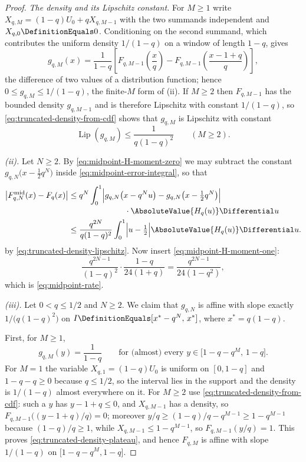 \documentclass[11pt,a4paper,oneside,openany]{book}
\theoremstyle{definition}
\theoremstyle{remark}
\begin{document}
\begin{proof}
\emph{The density and its Lipschitz constant.}  For $M\ge1$ write
$X_{q,M}=(1-q)U_0+qX_{q,M-1}$ with the two summands independent and
$X_{q,0}\DefinitionEquals0$.  Conditioning on the second summand, which contributes the
uniform density $1/(1-q)$ on a window of length $1-q$, gives
\begin{equation}\label{eq:truncated-density-from-cdf}
 g_{q,M}(x)=\frac1{1-q}
 \left[F_{q,M-1}\!\left(\frac xq\right)-F_{q,M-1}\!\left(\frac{x-1+q}q\right)\right],
\end{equation}
the difference of two values of a distribution function; hence
$0\le g_{q,M}\le1/(1-q)$, the finite-$M$ form of
(ii).  If $M\ge2$ then $F_{q,M-1}$ has
the bounded density $g_{q,M-1}$ and is therefore Lipschitz with constant
$1/(1-q)$, so \eqref{eq:truncated-density-from-cdf} shows that $g_{q,M}$ is
Lipschitz with constant
\begin{equation}\label{eq:truncated-density-lipschitz}
 \operatorname{Lip}(g_{q,M})\le\frac1{q(1-q)^2}
 \qquad(M\ge2).
\end{equation}

\emph{(ii).}  Let $N\ge2$.  By \eqref{eq:midpoint-H-moment-zero} we may subtract
the constant $g_{q,N}\bigl(x-\tfrac12q^N\bigr)$ inside
\eqref{eq:midpoint-error-integral}, so that
\[
 \begin{aligned}
  \bigl|F^{\mathrm{mid}}_{q,N}(x)-F_q(x)\bigr|
  &\le q^N\int_0^1\Bigl|g_{q,N}\bigl(x-q^Nu\bigr)
    -g_{q,N}\bigl(x-\tfrac12q^N\bigr)\Bigr|\\[-2pt]
  &\hspace{7em}{}\cdot\AbsoluteValue{H_q(u)}\Differential u\\
  &\le\frac{q^{2N}}{q(1-q)^2}\int_0^1
    \Bigl|u-\tfrac12\Bigr|\AbsoluteValue{H_q(u)}\Differential u .
 \end{aligned}
\]
by \eqref{eq:truncated-density-lipschitz}.  Now insert
\eqref{eq:midpoint-H-moment-one}:
\[
 \frac{q^{2N-1}}{(1-q)^2}\cdot\frac{1-q}{24(1+q)}
 =\frac{q^{2N-1}}{24(1-q^2)} ,
\]
which is \eqref{eq:midpoint-rate}.

\emph{(iii).}  Let $0<q\le1/2$ and $N\ge2$.  We claim that $g_{q,N}$ is affine
with slope exactly $1/\bigl(q(1-q)^2\bigr)$ on
$I\DefinitionEquals[x^\ast-q^N,\,x^\ast]$, where $x^\ast=q(1-q)$.

First, for $M\ge1$,
\begin{equation}\label{eq:truncated-density-plateau}
 g_{q,M}(y)=\frac1{1-q}
 \qquad\text{for (almost) every }y\in\bigl[1-q-q^M,\,1-q\bigr].
\end{equation}
For $M=1$ the variable $X_{q,1}=(1-q)U_0$ is uniform on $[0,1-q]$ and
$1-q-q\ge0$ because $q\le1/2$, so the interval lies in the support and the
density is $1/(1-q)$ almost everywhere on it.  For $M\ge2$ use
\eqref{eq:truncated-density-from-cdf}: such a $y$ has $y-1+q\le0$, and
$X_{q,M-1}$ has a density, so $F_{q,M-1}\bigl((y-1+q)/q\bigr)=0$; moreover
$y/q\ge(1-q)/q-q^{M-1}\ge1-q^{M-1}$ because $(1-q)/q\ge1$, while
$X_{q,M-1}\le1-q^{M-1}$, so $F_{q,M-1}(y/q)=1$.  This proves
\eqref{eq:truncated-density-plateau}, and hence $F_{q,M}$ is affine with slope
$1/(1-q)$ on $\bigl[1-q-q^M,1-q\bigr]$.


\end{proof}
\end{document}
